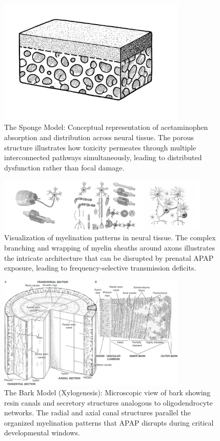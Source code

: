 \documentclass[12pt]{article}
\begin{document}
\begin{figure}[h]
\centering
\includegraphics[width=0.8\textwidth]{../assets/SpongeModel.jpg}
\caption{The Sponge Model: Conceptual representation of acetaminophen absorption and distribution across neural tissue. The porous structure illustrates how toxicity permeates through multiple interconnected pathways simultaneously, leading to distributed dysfunction rather than focal damage.}
\label{fig:spongemodel}
\end{figure}

\begin{figure}[h]
\centering
\includegraphics[width=0.9\textwidth]{../assets/mylination.jpg}
\caption{Visualization of myelination patterns in neural tissue. The complex branching and wrapping of myelin sheaths around axons illustrates the intricate architecture that can be disrupted by prenatal APAP exposure, leading to frequency-selective transmission deficits.}
\label{fig:mylination}
\end{figure}

\begin{figure}[h]
\centering
\includegraphics[width=0.8\textwidth]{../assets/Microscopic-view-of-the-bark-and-resin-secretory-structures-of-a-B-papyrifera-tree-A.png}
\caption{The Bark Model (Xylogenesis): Microscopic view of bark showing resin canals and secretory structures analogous to oligodendrocyte networks. The radial and axial canal structures parallel the organized myelination patterns that APAP disrupts during critical developmental windows.}
\label{fig:microscopic}
\end{figure}
\end{document}
